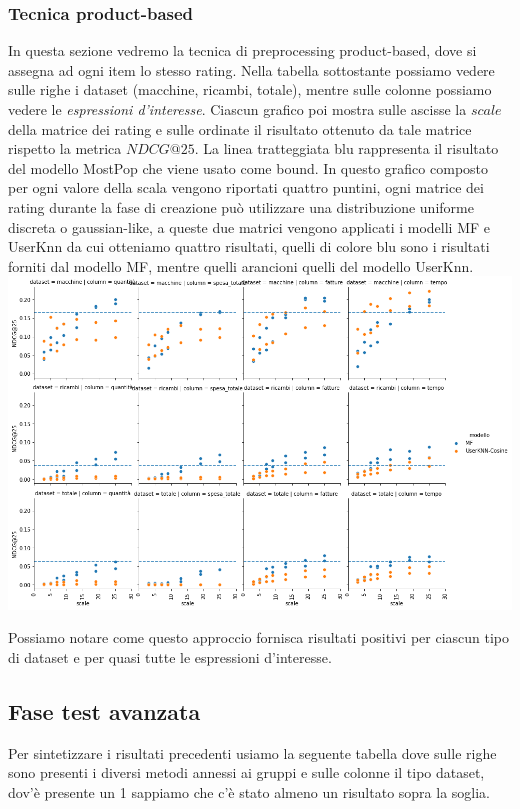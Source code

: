 \subsubsection{Tecnica product-based}
In questa sezione vedremo la tecnica di preprocessing product-based, dove si assegna ad ogni item lo stesso rating.
Nella tabella sottostante possiamo vedere sulle righe i dataset (macchine, ricambi, totale), mentre sulle colonne possiamo vedere le \textit{espressioni d'interesse}. Ciascun grafico poi mostra sulle ascisse la $scale$ della matrice dei rating e sulle ordinate il risultato ottenuto da tale matrice rispetto la metrica $NDCG@25$. La linea tratteggiata blu rappresenta il risultato del modello MostPop che viene usato come bound.
In questo grafico composto per ogni valore della scala vengono riportati quattro puntini, ogni matrice dei rating durante la fase di creazione può utilizzare una distribuzione uniforme discreta o gaussian-like, a queste due matrici vengono applicati i modelli MF e UserKnn da cui otteniamo quattro risultati, quelli di colore blu sono i risultati forniti dal modello MF, mentre quelli arancioni quelli del modello UserKnn.\\

\includegraphics[width=16cm]{figures/prodotto.png}

Possiamo notare come questo approccio fornisca risultati positivi per ciascun tipo di dataset e per quasi tutte le espressioni d'interesse.

\subsection{Fase test avanzata}
Per sintetizzare i risultati precedenti usiamo la seguente tabella dove sulle righe sono presenti i diversi metodi annessi ai gruppi e sulle colonne il tipo dataset, dov'è presente un 1 sappiamo che c'è stato almeno un risultato sopra la soglia.\\

